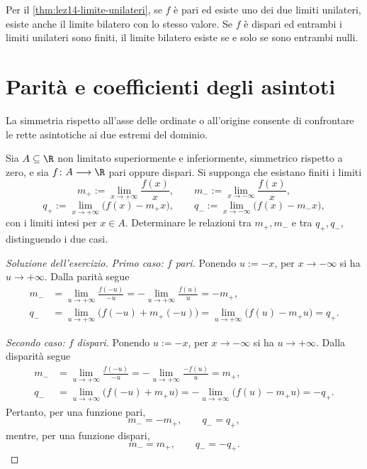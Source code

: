Per il \cref{thm:lez14-limite-unilateri},
se \(f\) è pari ed esiste uno dei due limiti unilateri,
esiste anche il limite bilatero con lo stesso valore.
Se \(f\) è dispari ed entrambi i limiti unilateri sono
finiti, il limite bilatero esiste se e solo se sono
entrambi nulli.

\section{Parità e coefficienti degli asintoti}
\label{sec:lez19-parita-asintoti}

La simmetria rispetto all'asse delle ordinate o
all'origine consente di confrontare le rette
asintotiche ai due estremi del dominio.

\begin{exercise}
\label{ex:lez19-coefficienti-asintotici}
Sia \(A\subseteq\R\) non limitato superiormente e
inferiormente, simmetrico rispetto a zero, e sia
\(f\colon A\longrightarrow\R\) pari oppure dispari.
Si supponga che esistano finiti i limiti
\[
  m_+:=\lim_{x\to+\infty}\frac{f(x)}x,
  \qquad
  m_-:=\lim_{x\to-\infty}\frac{f(x)}x,
\]
\[
  q_+:=\lim_{x\to+\infty}\bigl(f(x)-m_+x\bigr),
  \qquad
  q_-:=\lim_{x\to-\infty}\bigl(f(x)-m_-x\bigr),
\]
con i limiti intesi per \(x\in A\).
Determinare le relazioni tra \(m_+,m_-\) e tra
\(q_+,q_-\), distinguendo i due casi.
\end{exercise}

\begin{proof}[Soluzione dell'esercizio]
\emph{Primo caso: \(f\) pari.}
Ponendo \(u:=-x\), per \(x\to-\infty\) si ha
\(u\to+\infty\). Dalla parità segue
\[
\begin{aligned}
  m_-
  &=\lim_{u\to+\infty}\frac{f(-u)}{-u}
   =-\lim_{u\to+\infty}\frac{f(u)}u
   =-m_+,\\
  q_-
  &=\lim_{u\to+\infty}\bigl(f(-u)+m_+(-u)\bigr)
   =\lim_{u\to+\infty}\bigl(f(u)-m_+u\bigr)
   =q_+.
\end{aligned}
\]

\emph{Secondo caso: \(f\) dispari.}
Ponendo \(u:=-x\), per \(x\to-\infty\) si ha
\(u\to+\infty\). Dalla disparità segue
\[
\begin{aligned}
  m_-
  &=\lim_{u\to+\infty}\frac{f(-u)}{-u}
   =-\lim_{u\to+\infty}\frac{-f(u)}u
   =m_+,\\
  q_-
  &=\lim_{u\to+\infty}\bigl(f(-u)+m_+u\bigr)
   =-\lim_{u\to+\infty}\bigl(f(u)-m_+u\bigr)
   =-q_+.
\end{aligned}
\]
Pertanto, per una funzione pari,
\[
  m_-=-m_+ ,\qquad q_-=q_+,
\]
mentre, per una funzione dispari,
\[
  m_-=m_+ ,\qquad q_-=-q_+.
\]
\end{proof}

